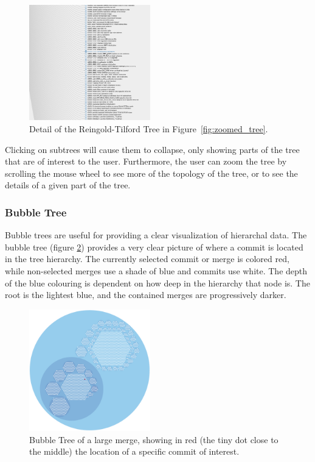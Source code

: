 \documentclass[conference, draftclsnofoot, draft]{IEEEtran}
\begin{document}
\begin{figure}
        \centering
        \includegraphics[width=0.47\textwidth]{figures/tree_view.png}
        \caption{Detail of the Reingold-Tilford Tree in Figure~\ref{fig:zoomed_tree}.}
        \label{fig:tree}
\end{figure}

Clicking on subtrees will cause them to collapse, only showing parts of the tree
that are of interest to the user. Furthermore, the user can zoom the tree by
scrolling the mouse wheel to see more of the topology of the tree, or to see the
details of a given part of the tree.



\subsubsection{Bubble Tree}


Bubble trees are useful for providing a clear visualization of hierarchal
data\cite{Boardman2000}. The bubble tree (figure \ref{fig:bubble_tree}) provides a
very clear picture of where a commit is located in the tree hierarchy. The currently
selected commit or merge is colored red, while non-selected merges use a shade of
blue and commits use white.  The depth of the blue colouring is dependent on how
deep in the hierarchy that node is. The root is the lightest blue, and the contained
merges are progressively darker.

\begin{figure}
        \centering
        \includegraphics[width=0.47\textwidth]{figures/bubble_tree.pdf}
        \caption{Bubble Tree of a large merge, showing in red (the tiny dot close to the middle) the location of a specific commit of interest.}
        \label{fig:bubble_tree}
\end{figure}
\end{document}
